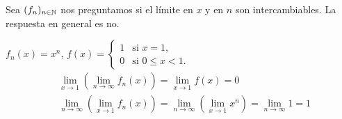 \begin{note}
  Sea \((f_n)_{n \in \mathbb{N}}\) nos preguntamos si el límite en \(x\) y en \(n\) son intercambiables. La respuesta en general es no.
\end{note}

\begin{eg}
  \(f_n(x) = x^n\), \(f(x) = \begin{cases}
      1 & \text{si } x = 1,        \\
      0 & \text{si } 0 \leq x < 1.
    \end{cases}\) \begin{align*}
    & \lim_{x \to 1} \left(\lim_{n \to \infty} f_n(x)\right) = \lim_{x \to 1} f(x) = 0 \\
    & \lim_{n \to \infty} \left(\lim_{x \to 1} f_n(x)\right) = \lim_{n \to \infty} \left(\lim_{x \to 1} x^n\right) = \lim_{n \to \infty} 1 = 1
  \end{align*}
\end{eg}

